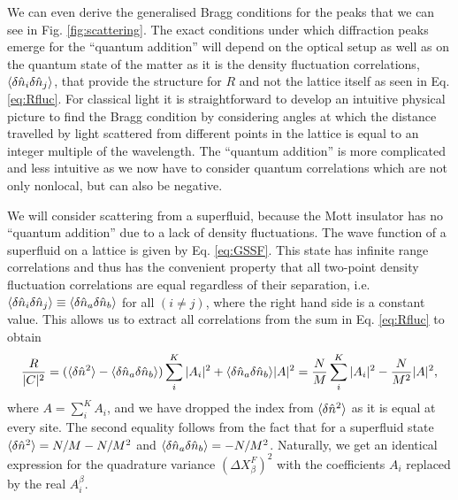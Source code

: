 We can even derive the generalised Bragg conditions for the peaks that
we can see in Fig. \ref{fig:scattering}. The exact conditions under
which diffraction peaks emerge for the ``quantum addition'' will
depend on the optical setup as well as on the quantum state of the
matter as it is the density fluctuation correlations,
$\langle \delta \hat{n}_i \delta \hat{n}_j \rangle$, that provide the structure for $R$ and
not the lattice itself as seen in Eq. \eqref{eq:Rfluc}. For classical
light it is straightforward to develop an intuitive physical picture
to find the Bragg condition by considering angles at which the
distance travelled by light scattered from different points in the
lattice is equal to an integer multiple of the wavelength. The
``quantum addition'' is more complicated and less intuitive as we now
have to consider quantum correlations which are not only nonlocal, but
can also be negative.

We will consider scattering from a superfluid, because the Mott
insulator has no ``quantum addition'' due to a lack of density
fluctuations. The wave function of a superfluid on a lattice is given
by Eq. \eqref{eq:GSSF}. This state has infinite range correlations and
thus has the convenient property that all two-point density
fluctuation correlations are equal regardless of their separation,
i.e.~$\langle \delta \hat{n}_i \delta \hat{n}_j \rangle \equiv \langle \delta \hat{n}_a \delta \hat{n}_b \rangle$
for all $(i \ne j)$, where the right hand side is a constant
value. This allows us to extract all correlations from the sum in
Eq. \eqref{eq:Rfluc} to obtain
\begin{equation}
  \label{eq:RSF}
  \frac{R}{|C|^2} = (\langle \delta \hat{n}^2 \rangle - \langle \delta \hat{n}_a \delta \hat{n}_b \rangle) \sum_i^K
  |A_i|^2 + \langle \delta \hat{n}_a \delta \hat{n}_b \rangle |A|^2 = \frac{N}{M} \sum_i^K
  |A_i|^2 - \frac{N}{M^2} |A|^2,
\end{equation}
where $A = \sum_i^K A_i$, and we have dropped the index from
$\langle \delta \hat{n}^2 \rangle$ as it is equal at every site. The second
equality follows from the fact that for a superfluid state
$\langle \delta \hat{n}^2 \rangle = N/M - N/M^2$ and
$\langle \delta \hat{n}_a \delta \hat{n}_b \rangle = -N/M^2$. Naturally, we get an identical
expression for the quadrature variance $(\Delta X^F_\beta)^2$ with the
coefficients $A_i$ replaced by the real $A_i^\beta$.


